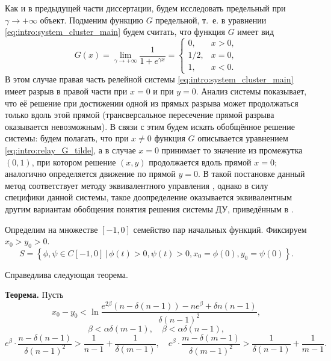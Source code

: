 Как и в предыдущей части диссертации, будем исследовать предельный при $\gamma \to +\infty$ объект. Подменим функцию $G$ предельной, т.~е. в уравнении \eqref{eq:intro:system_cluster_main} будем считать, что функция $G$ имеет вид 
\begin{equation}
	\label{eq:intro:relay_G_tilde}
	G(x) = \lim\limits_{\gamma \to +\infty} \dfrac{1}{1 + e^{\gamma x}} = 
	\begin{cases}
		0, & x > 0,\\
		1/2, & x = 0,\\
		1, & x < 0.
	\end{cases}
\end{equation}
%
В этом случае правая часть релейной системы \eqref{eq:intro:system_cluster_main} имеет разрыв в правой части при $x = 0$ и при $y = 0$. Анализ системы показывает, что её решение при достижении одной из прямых разрыва может продолжаться только вдоль этой прямой (трансверсальное пересечение прямой разрыва оказывается невозможным). В связи с этим будем искать обобщённое решение системы: будем полагать, что при $x \neq 0$ функция $G$ описывается уравнением \eqref{eq:intro:relay_G_tilde}, а в случае $x = 0$ принимает то значение из промежутка $(0, 1)$, при котором решение $(x, y)$ продолжается вдоль прямой $x = 0$; аналогично определяется движение по прямой $y = 0$. В такой постановке данный метод соответствует методу эквивалентного управления \cite{Utkin1981}, однако в силу специфики данной системы, такое доопределение оказывается эквивалентным другим вариантам обобщения понятия решения системы ДУ, приведённым в \cite{Filippov1988}.


Определим на множестве $[-1, 0]$ семейство пар начальных функций. Фиксируем $x_0 > y_0 > 0$.
\small
\begin{equation}
	\label{eq:intro:initial_set}
	S = \left\{\phi, \psi \in C[-1, 0] \,|\, \phi(t) > 0, \psi(t) > 0, x_0 = \phi(0), y_0 = \psi(0)\right\}.
\end{equation}
\normalsize

Справедлива следующая теорема.

\bigskip

\textbf{Теорема.}
	Пусть 
	\begin{equation}
		\label{eq:intro:constraint_1}
		x_0 - y_0 < \ln \dfrac{e^{2\beta}(n - \delta(n - 1)) - ne^{\beta} + \delta n(n - 1)}{\delta (n - 1)^2},
	\end{equation}
	\begin{equation}
		\label{eq:intro:constraint_2}
		\beta < \alpha \delta (m - 1), \quad \beta < \alpha \delta (n - 1),
	\end{equation}
	\small
	\begin{equation}
		\label{eq:intro:constraint_3}
		e^{\beta} \cdot \dfrac{n - \delta(n - 1)}{\delta (n - 1)^2} > \dfrac{1}{n - 1} + \dfrac{1}{\delta(m - 1)}, \quad
		e^{\beta} \cdot \dfrac{m - \delta(m - 1)}{\delta (m - 1)^2} > \dfrac{1}{\delta(n - 1)} + \dfrac{1}{m - 1}.
	\end{equation}
	\normalsize
	

